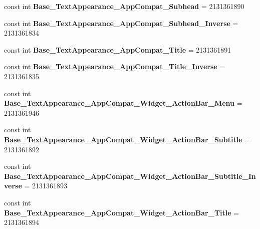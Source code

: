 \begin{DoxyCompactItemize}
const int {\bfseries Base\+\_\+\+Text\+Appearance\+\_\+\+App\+Compat\+\_\+\+Subhead} = 2131361890
\item 
\mbox{\label{class_sample_app_1_1_droid_1_1_resource_1_1_style_a042d45e92082b4179f9e0634c3be15dc}} 
const int {\bfseries Base\+\_\+\+Text\+Appearance\+\_\+\+App\+Compat\+\_\+\+Subhead\+\_\+\+Inverse} = 2131361834
\item 
\mbox{\label{class_sample_app_1_1_droid_1_1_resource_1_1_style_a1c6d7bdabcba6c1f828abbfe258f8700}} 
const int {\bfseries Base\+\_\+\+Text\+Appearance\+\_\+\+App\+Compat\+\_\+\+Title} = 2131361891
\item 
\mbox{\label{class_sample_app_1_1_droid_1_1_resource_1_1_style_aaaa977ad8173c548b48f501737138e04}} 
const int {\bfseries Base\+\_\+\+Text\+Appearance\+\_\+\+App\+Compat\+\_\+\+Title\+\_\+\+Inverse} = 2131361835
\item 
\mbox{\label{class_sample_app_1_1_droid_1_1_resource_1_1_style_a414d24bf67e54d815f604a1f80e62d00}} 
const int {\bfseries Base\+\_\+\+Text\+Appearance\+\_\+\+App\+Compat\+\_\+\+Widget\+\_\+\+Action\+Bar\+\_\+\+Menu} = 2131361946
\item 
\mbox{\label{class_sample_app_1_1_droid_1_1_resource_1_1_style_a4e02d6d3ddff098c36eddf8dcab3ab3a}} 
const int {\bfseries Base\+\_\+\+Text\+Appearance\+\_\+\+App\+Compat\+\_\+\+Widget\+\_\+\+Action\+Bar\+\_\+\+Subtitle} = 2131361892
\item 
\mbox{\label{class_sample_app_1_1_droid_1_1_resource_1_1_style_a0628a77684a6ddc0d639453ad3dda6d8}} 
const int {\bfseries Base\+\_\+\+Text\+Appearance\+\_\+\+App\+Compat\+\_\+\+Widget\+\_\+\+Action\+Bar\+\_\+\+Subtitle\+\_\+\+Inverse} = 2131361893
\item 
\mbox{\label{class_sample_app_1_1_droid_1_1_resource_1_1_style_aa4e7c23a24d57fa670899364c89eb79a}} 
const int {\bfseries Base\+\_\+\+Text\+Appearance\+\_\+\+App\+Compat\+\_\+\+Widget\+\_\+\+Action\+Bar\+\_\+\+Title} = 2131361894

\end{DoxyCompactItemize}
